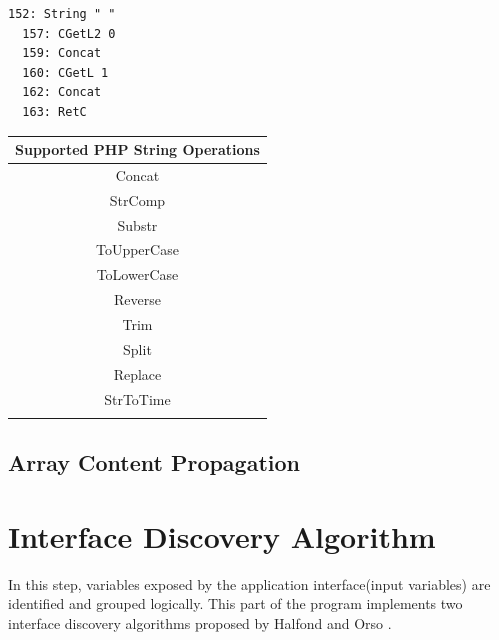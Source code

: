 \begin{minipage}{\textwidth}
\begin{lstlisting}[basicstyle=\small,frame=single]
  152: String " "
  157: CGetL2 0
  159: Concat
  160: CGetL 1
  162: Concat
  163: RetC
\end{lstlisting}
\end{minipage}

\begin{table}
\begin{tabular}{c}
Supported PHP String Operations \\
\hline
Concat \\
StrComp \\
Substr \\
ToUpperCase \\
ToLowerCase \\
Reverse \\
Trim \\
Split \\
Replace \\
StrToTime \\
\label{Supported PHP string operations}
\end{tabular}
\end{table}

\subsection{Array Content Propagation}
\blindtext

\section{Interface Discovery Algorithm}
In this step, variables exposed by the application interface(input variables) are identified and grouped logically. This part of the program implements two interface discovery algorithms proposed by Halfond and Orso \cite{ref3}.

